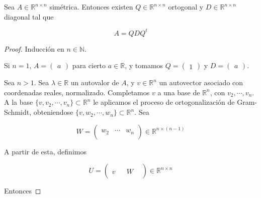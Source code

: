 \begin{propo}
Sea $A \in \mathbb{R}^{n \times n}$ simétrica. Entonces existen $Q \in \mathbb{R}^{n \times n}$ ortogonal y $D \in \mathbb{R}^{n \times n}$ diagonal tal que

\[A = Q D Q^t\]
\begin{proof}

Inducción en $n \in \mathbb{N}$.

Si $n = 1$, $A = \begin{pmatrix} a \end{pmatrix}$ para cierto $a \in \mathbb{R}$, y tomamos $Q = \begin{pmatrix} 1 \end{pmatrix}$ y $D = \begin{pmatrix} a \end{pmatrix}$.

Sea $n > 1$. Sea $\lambda \in \mathbb{R}$ un autovalor de $A$, y $v \in \mathbb{R}^n$ un autovector asociado con coordenadas reales,  normalizado. Completamos $v$ a una base de $\mathbb{R}^n$, con $v_2, \cdots, v_n$. A la base $\{v, v_2, \cdots, v_n\} \subset \mathbb{R}^n$ le aplicamos el proceso de ortogonalización de Gram-Schmidt, obteniendose $\{v, w_2, \cdots, w_n\} \subset \mathbb{R}^n$. Sea 

\[W = \left(\begin{array}{c|c|c}
& &\\
w_2 & \cdots & w_n\\
& &
\end{array}\right) \in \mathbb{R}^{n \times (n - 1)}\]

A partir de esta, definimos

\[U = \left(\begin{array}{c|ccc}
& & &\\
v& & W &\\
& & &
\end{array}\right) \in \mathbb{R}^{n \times n}\]

Entonces 


\end{proof}
\end{propo}
